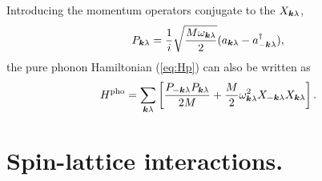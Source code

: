 \documentclass[aps,prl,twocolumn,superscriptaddress,amsmath,amssymb,floats,aps,10pt]{revtex4-1}
\begin{document}
Introducing the momentum operators conjugate to the $X_{\bm{k} \lambda}$,
 \begin{equation}
 P_{ \bm{k} \lambda }  =   \frac{1}{i} \sqrt{ \frac{  M \omega_{\bm{k} \lambda }}{2}  }
 ( a_{ \bm{k} \lambda } -  a_{ -\bm{k} \lambda }^{\dagger} ),
\end{equation}
the pure phonon Hamiltonian (\ref{eq:Hp}) can also be written as
 \begin{equation}
{H}^{\mathrm{ pho}} =    \sum_{ \bm{k}  \lambda } \left[
 \frac{ P_{ - \bm{k} \lambda} P_{  \bm{k} \lambda}}{2 M} +
 \frac{M}{2} \omega^2_{ \bm{k} \lambda}  X_{ - \bm{k} \lambda} X_{  \bm{k} \lambda}
 \right].
 \end{equation}


\section{Spin-lattice interactions.}
\end{document}
